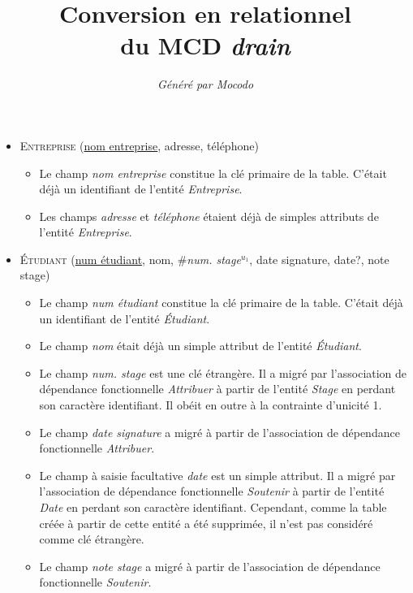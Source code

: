 \documentclass[a4paper]{article}
\title{Conversion en relationnel\\du MCD \emph{drain}}
\author{\emph{Généré par Mocodo}}
\newcommand{\relat}[1]{\textsc{#1}}
\newcommand{\attr}[1]{#1}
\newcommand{\prim}[1]{\uline{#1}}
\newcommand{\foreign}[1]{\#\textsl{#1}}
\begin{document}
\maketitle

\begin{itemize}
  \item \relat{Entreprise} (\prim{nom entreprise}, \attr{adresse}, \attr{téléphone})
  \begin{itemize}
    \item Le champ \emph{nom entreprise} constitue la clé primaire de la table. C'était déjà un identifiant de l'entité \emph{Entreprise}.
    \item Les champs \emph{adresse} et \emph{téléphone} étaient déjà de simples attributs de l'entité \emph{Entreprise}.
  \end{itemize}

  \item \relat{Étudiant} (\prim{num étudiant}, \attr{nom}, \foreign{num. stage}$^{u_1}$, \attr{date signature}, \attr{date?}, \attr{note stage})
  \begin{itemize}
    \item Le champ \emph{num étudiant} constitue la clé primaire de la table. C'était déjà un identifiant de l'entité \emph{Étudiant}.
    \item Le champ \emph{nom} était déjà un simple attribut de l'entité \emph{Étudiant}.
    \item Le champ \emph{num. stage} est une clé étrangère. Il a migré par l'association de dépendance fonctionnelle \emph{Attribuer} à partir de l'entité \emph{Stage} en perdant son caractère identifiant. Il obéit en outre à la contrainte d'unicité 1.
    \item Le champ \emph{date signature} a migré à partir de l'association de dépendance fonctionnelle \emph{Attribuer}.
    \item Le champ à saisie facultative \emph{date} est un simple attribut. Il a migré par l'association de dépendance fonctionnelle \emph{Soutenir} à partir de l'entité \emph{Date} en perdant son caractère identifiant. Cependant, comme la table créée à partir de cette entité a été supprimée, il n'est pas considéré comme clé étrangère.
    \item Le champ \emph{note stage} a migré à partir de l'association de dépendance fonctionnelle \emph{Soutenir}.
  \end{itemize}


\end{itemize}
\end{document}
